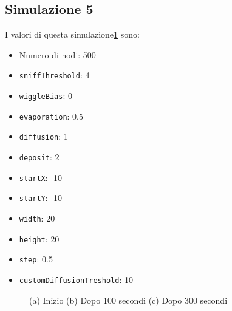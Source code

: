 \subsection{Simulazione 5}\label{sim5}
I valori di questa simulazione\space \cref{fig:sim5} sono:
\begin{itemize}
    \item Numero di nodi: 500
    \item \texttt{sniffThreshold}: 4
    \item \texttt{wiggleBias}: 0
    \item \texttt{evaporation}: 0.5
    \item \texttt{diffusion}: 1
    \item \texttt{deposit}: 2
    \item \texttt{startX}: -10
    \item \texttt{startY}: -10
    \item \texttt{width}: 20
    \item \texttt{height}: 20
    \item \texttt{step}: 0.5
    \item \texttt{customDiffusionTreshold}: 10
\end{itemize}
\begin{figure}[ht]
    \centering
    \caption{(a) Inizio (b) Dopo 100 secondi (c) Dopo 300 secondi}\label{fig:sim5}
\end{figure}

